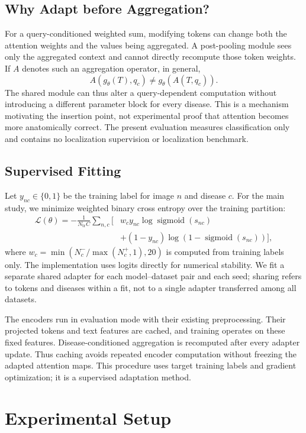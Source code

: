 \documentclass[10pt,twocolumn,letterpaper]{article}
\DeclareMathOperator{\sigmoid}{sigmoid}
\begin{document}
\subsection{Why Adapt before Aggregation?}
For a query-conditioned weighted sum, modifying tokens can change both the attention weights and the values being aggregated. A post-pooling module sees only the aggregated context and cannot directly recompute those token weights. If $A$ denotes such an aggregation operator, in general,
\begin{equation}
A(g_\theta(T),q_c)\ne g_\theta\!\left(A(T,q_c)\right).
\end{equation}
The shared module can thus alter a query-dependent computation without introducing a different parameter block for every disease. This is a mechanism motivating the insertion point, not experimental proof that attention becomes more anatomically correct. The present evaluation measures classification only and contains no localization supervision or localization benchmark.

\subsection{Supervised Fitting}
Let $y_{nc}\in\{0,1\}$ be the training label for image $n$ and disease $c$. For the main study, we minimize weighted binary cross entropy over the training partition:
\begin{align}
\mathcal L(\theta)=-\frac{1}{N_{\mathrm{tr}}C}\sum_{n,c}
\Big[&w_c y_{nc}\log\sigmoid(s_{nc})\nonumber\\
&+(1-y_{nc})\log(1-\sigmoid(s_{nc}))\Big],
\end{align}
where $w_c=\min(N_c^-/\max(N_c^+,1),20)$ is computed from training labels only. The implementation uses logits directly for numerical stability. We fit a separate shared adapter for each model--dataset pair and each seed; sharing refers to tokens and diseases within a fit, not to a single adapter transferred among all datasets.

The encoders run in evaluation mode with their existing preprocessing. Their projected tokens and text features are cached, and training operates on these fixed features. Disease-conditioned aggregation is recomputed after every adapter update. Thus caching avoids repeated encoder computation without freezing the adapted attention maps. This procedure uses target training labels and gradient optimization; it is a supervised adaptation method.

\section{Experimental Setup}
\label{sec:setup}
\end{document}
